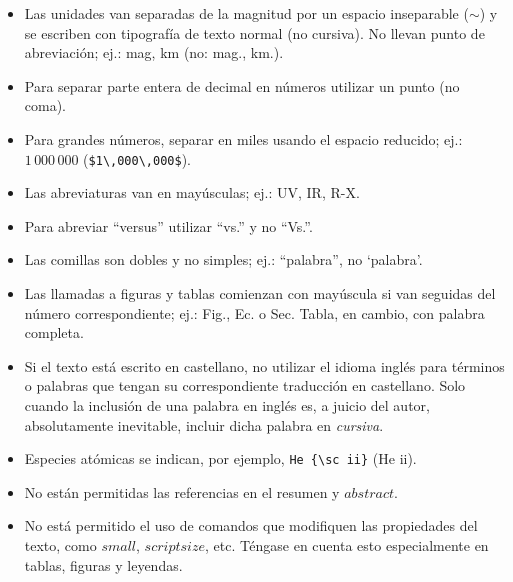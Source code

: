 \documentclass[baaa]{baaa}
\begin{document}
\begin{itemize}
  \item Las unidades van separadas de la magnitud por un espacio inseparable ($\sim$) y se escriben con tipografía de texto normal (no cursiva). No llevan punto de abreviación; ej.: mag, km (no: mag., km.).
  \item Para separar parte entera de decimal en números utilizar un punto (no coma).
  \item Para grandes números, separar en miles usando el espacio reducido; ej.: $1\,000\,000$ (\verb+$1\,000\,000$+).
  \item Las abreviaturas van en mayúsculas; ej.: UV, IR, R-X.
  \item Para abreviar ``versus'' utilizar ``vs.'' y no ``Vs.''.
  \item Las comillas son dobles y no simples; ej.: ``palabra'', no `palabra'.
  \item Las llamadas a figuras y tablas comienzan con mayúscula si van seguidas del número correspon\-dien\-te; ej.: Fig., Ec. o Sec. Tabla, en cambio, con pa\-la\-bra completa.
  \item Si el texto está escrito en castellano, no utilizar el idioma inglés para términos o palabras que tengan  su correspondiente traducción en castellano. Solo cuando la inclusión de una palabra en inglés es, a juicio del autor, absolutamente inevitable, incluir dicha palabra en {\em cursiva}.
  \item Especies atómicas se indican, por ejemplo, \verb|He {\sc ii}| (He {\sc ii}).
  \item No están permitidas las referencias en el resumen y $abstract$.
  \item No está permitido el uso de comandos que mo\-di\-fiquen las propiedades del texto, como $small$, $scriptsize$, etc. Téngase en cuenta esto especialmente en tablas, figuras y leyendas.
\end{itemize}
\end{document}
